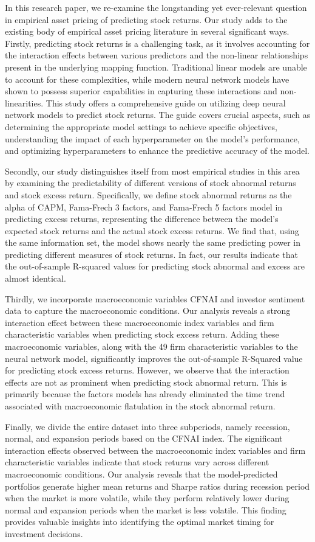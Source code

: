 In this research paper, we re-examine the longstanding yet ever-relevant question in empirical asset pricing of predicting stock returns. Our study adds to the existing body of empirical asset pricing literature in several significant ways. Firstly, predicting stock returns is a challenging task, as it involves accounting for the interaction effects between various predictors and the non-linear relationships present in the underlying mapping function. Traditional linear models are unable to account for these complexities, while modern neural network models have shown to possess superior capabilities in capturing these interactions and non-linearities. This study offers a comprehensive guide on utilizing deep neural network models to predict stock returns. The guide covers crucial aspects, such as determining the appropriate model settings to achieve specific objectives, understanding the impact of each hyperparameter on the model's performance, and optimizing hyperparameters to enhance the predictive accuracy of the model.

Secondly, our study distinguishes itself from most empirical studies in this area by examining the predictability of different versions of stock abnormal returns and stock excess return. Specifically, we define stock abnormal returns as the alpha of CAPM, Fama-Frech 3 factors, and Fama-Frech 5 factors model in predicting excess returns, representing the difference between the model's expected stock returns and the actual stock excess returns. We find that, using the same information set, the model shows nearly the same predicting power in predicting different measures of stock returns. In fact, our results indicate that the out-of-sample R-squared values for predicting stock abnormal and excess are almost identical.

Thirdly, we incorporate macroeconomic variables CFNAI and investor sentiment data to capture the macroeconomic conditions. Our analysis reveals a strong interaction effect between these macroeconomic index variables and firm characteristic variables when predicting stock excess return. Adding these macroeconomic variables, along with the 49 firm characteristic variables to the neural network model, significantly improves the out-of-sample R-Squared value for predicting stock excess returns. However, we observe that the interaction effects are not as prominent when predicting stock abnormal return. This is primarily because the factors models has already eliminated the time trend associated with macroeconomic flatulation in the stock abnormal return.

Finally, we divide the entire dataset into three subperiods, namely recession, normal, and expansion periods based on the CFNAI index. The significant interaction effects observed between the macroeconomic index variables and firm characteristic variables indicate that stock returns vary across different macroeconomic conditions. Our analysis reveals that the model-predicted portfolios generate higher mean returns and Sharpe ratios during recession period when the market is more volatile, while they perform relatively lower during normal and expansion periods when the market is less volatile. This finding provides valuable insights into identifying the optimal market timing for investment decisions.